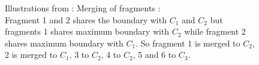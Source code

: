 \begin{figure}[h]
  \centering
  \captionsetup[subfloat]{labelformat=empty}
%
%
%
%
\caption{Illustrations from \cite{umesh2001efficient}: Merging of fragments :\\
Fragment 1 and 2 shares the boundary with \( C_1 \) and \( C_2 \) but fragments 1 shares maximum boundary with \( C_2 \) while fragment 2 shares maximum boundary with  {\( C_1 \)}. So fragment 1 is merged to  {\( C_2 \)}, 2 is merged to {\( C_1 \)}, 3 to {\( C_2 \)}, 4 to {\( C_2 \)}, 5 and 6 to {\( C_3 \)}.}
  \label{fig:watershedMerge}
\end{figure}
